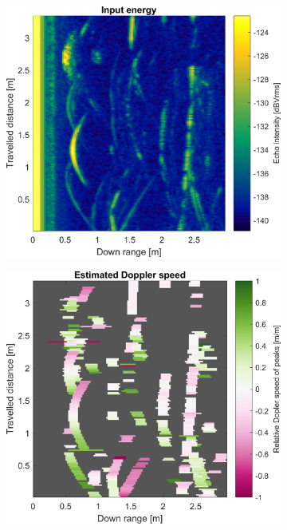 \begin{figure}[htbp]
    \centering
    \begin{subfigure}[t]{0.475\linewidth}
        \centering
        \includegraphics[width=\linewidth,max height=.475\textheight]{gfx/results/basement_input.png}
    \end{subfigure}%
    \hfill%
    \begin{subfigure}[t]{0.475\linewidth}
        \centering
        \includegraphics[width=\linewidth,max height=.475\textheight]{gfx/results/basement_doppler.png}

\end{subfigure}
\end{figure}
